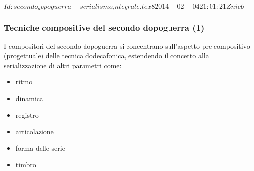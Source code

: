 %
%
\svnInfo $Id: secondo_dopoguerra-serialismo_integrale.tex 8 2014-02-04 21:01:21Z nicb $

\setcounter{ms}{0}
\begin{frame}
    \frametitle{Tecniche compositive del secondo dopoguerra (1)}

	I compositori del secondo dopoguerra
	si concentrano sull'aspetto pre-compositivo
	(progettuale)
	delle tecnica dodecafonica,
	estendendo il concetto alla
	serializzazione di altri parametri come:

  \begin{itemize}

    \item ritmo

    \item dinamica

    \item registro

    \item articolazione

    \item forma delle serie

    \item timbro

 \end{itemize}

\end{frame}

